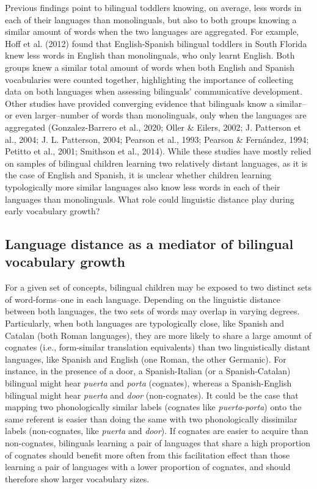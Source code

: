 \documentclass[
  letterpaper,
  DIV=11,
  numbers=noendperiod]{scrartcl}
\begin{document}
Previous findings point to bilingual toddlers knowing, on average, less
words in each of their languages than monolinguals, but also to both
groups knowing a similar amount of words when the two languages are
aggregated. For example, Hoff et al. (2012) found that English-Spanish
bilingual toddlers in South Florida knew less words in English than
monolinguals, who only learnt English. Both groups knew a similar total
amount of words when both English and Spanish vocabularies were counted
together, highlighting the importance of collecting data on both
languages when assessing bilinguals' communicative development. Other
studies have provided converging evidence that bilinguals know a
similar--or even larger--number of words than monolinguals, only when
the languages are aggregated (Gonzalez-Barrero et al., 2020; Oller \&
Eilers, 2002; J. Patterson et al., 2004; J. L. Patterson, 2004; Pearson
et al., 1993; Pearson \& Fernández, 1994; Petitto et al., 2001; Smithson
et al., 2014). While these studies have mostly relied on samples of
bilingual children learning two relatively distant languages, as it is
the case of English and Spanish, it is unclear whether children learning
typologically more similar languages also know less words in each of
their languages than monolinguals. What role could linguistic distance
play during early vocabulary growth?

\hypertarget{language-distance-as-a-mediator-of-bilingual-vocabulary-growth}{%
\subsection{Language distance as a mediator of bilingual vocabulary
growth}\label{language-distance-as-a-mediator-of-bilingual-vocabulary-growth}}

For a given set of concepts, bilingual children may be exposed to two
distinct sets of word-forms--one in each language. Depending on the
linguistic distance between both languages, the two sets of words may
overlap in varying degrees. Particularly, when both languages are
typologically close, like Spanish and Catalan (both Roman languages),
they are more likely to share a large amount of cognates (i.e.,
form-similar translation equivalents) than two linguistically distant
languages, like Spanish and English (one Roman, the other Germanic). For
instance, in the presence of a door, a Spanish-Italian (or a
Spanish-Catalan) bilingual might hear \emph{puerta} and \emph{porta}
(cognates), whereas a Spanish-English bilingual might hear \emph{puerta}
and \emph{door} (non-cognates). It could be the case that mapping two
phonologically similar labels (cognates like \emph{puerta}-\emph{porta})
onto the same referent is easier than doing the same with two
phonologically dissimilar labels (non-cognates, like \emph{puerta} and
\emph{door}). If cognates are easier to acquire than non-cognates,
bilinguals learning a pair of languages that share a high proportion of
cognates should benefit more often from this facilitation effect than
those learning a pair of languages with a lower proportion of cognates,
and should therefore show larger vocabulary sizes.
\end{document}
